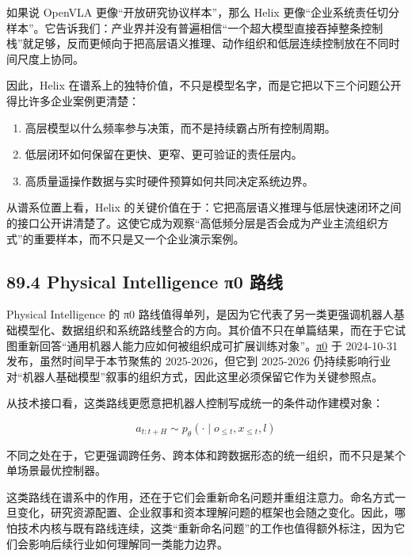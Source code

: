 如果说 OpenVLA 更像“开放研究协议样本”，那么 Helix 更像“企业系统责任切分样本”。它告诉我们：产业界并没有普遍相信“一个超大模型直接吞掉整条控制栈”就足够，反而更倾向于把高层语义推理、动作组织和低层连续控制放在不同时间尺度上协同。

因此，Helix 在谱系上的独特价值，不只是模型名字，而是它把以下三个问题公开得比许多企业案例更清楚：

\begin{enumerate}
\item 高层模型以什么频率参与决策，而不是持续霸占所有控制周期。
\item 低层闭环如何保留在更快、更窄、更可验证的责任层内。
\item 高质量遥操作数据与实时硬件预算如何共同决定系统边界。
\end{enumerate}

从谱系位置上看，Helix 的关键价值在于：它把高层语义推理与低层快速闭环之间的接口公开讲清楚了。这使它成为观察“高低频分层是否会成为产业主流组织方式”的重要样本，而不只是又一个企业演示案例。

\subsection*{89.4 Physical Intelligence π0 路线}


Physical Intelligence 的 π0 路线值得单列，是因为它代表了另一类更强调机器人基础模型化、数据组织和系统路线整合的方向。其价值不只在单篇结果，而在于它试图重新回答“通用机器人能力应如何被组织成可扩展训练对象”。\href{https://www.pi.website/blog/pi0}{π0} 于 2024-10-31 发布，虽然时间早于本节聚焦的 2025-2026，但它到 2025-2026 仍持续影响行业对“机器人基础模型”叙事的组织方式，因此这里必须保留它作为关键参照点。

从技术接口看，这类路线更愿意把机器人控制写成统一的条件动作建模对象：

\begingroup
\footnotesize
\begin{equation*}
a_{t:t+H} \sim p_{\theta}(\cdot \mid o_{\le t}, x_{\le t}, l)
\end{equation*}
\endgroup

不同之处在于，它更强调跨任务、跨本体和跨数据形态的统一组织，而不只是某个单场景最优控制器。

这类路线在谱系中的作用，还在于它们会重新命名问题并重组注意力。命名方式一旦变化，研究资源配置、企业叙事和资本理解问题的框架也会随之变化。因此，哪怕技术内核与既有路线连续，这类“重新命名问题”的工作也值得额外标注，因为它们会影响后续行业如何理解同一类能力边界。

